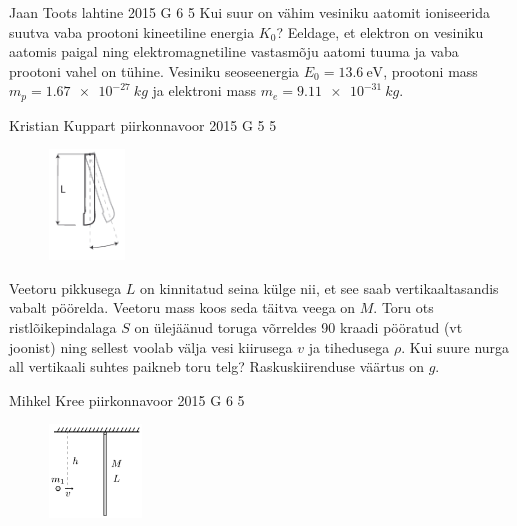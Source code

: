 \documentclass[11pt]{article}
\begin{document}
{%
{Jaan Toots} %
{lahtine} %
{2015} %
{G 6} %
{5} %
{
\ifStatement
Kui suur on vähim vesiniku aatomit ioniseerida suutva vaba prootoni kineetiline energia $K_0$? Eeldage, et elektron on vesiniku aatomis paigal ning elektromagnetiline vastasmõju aatomi tuuma ja vaba prootoni vahel on tühine. Vesiniku seoseenergia $E_0 = \SI{13.6}{\electronvolt}$, prootoni mass $m_p=\SI{1.67e-27}{kg}$ ja elektroni mass $m_e=\SI{9.11e-31}{kg}$.
\fi
}

{Kristian Kuppart} %
{piirkonnavoor} %
{2015} %
{G 5} %
{5} %
{
\ifStatement
\begin{figure}
 \vspace{-30pt}
 \begin{center}
 \includegraphics[width=0.18\textwidth]{2015-v2g-05-toru}
 \end{center}
\end{figure}
Veetoru pikkusega $L$ on kinnitatud seina külge nii, et see saab vertikaaltasandis vabalt pöörelda. Veetoru mass koos seda täitva veega on $M$. Toru ots ristlõikepindalaga $S$ on ülejäänud toruga võrreldes \num{90} kraadi pööratud (vt joonist) ning sellest voolab välja vesi kiirusega $v$ ja tihedusega $\rho$. Kui suure nurga all vertikaali suhtes paikneb toru telg? Raskuskiirenduse väärtus on $g$.
\fi
}

{Mihkel Kree} %
{piirkonnavoor} %
{2015} %
{G 6} %
{5} %
{
\ifStatement

\begin{figure}
 \begin{center}
 \includegraphics[width=0.22\textwidth]{2015-v2g-06-porgejoonis}
 \end{center}
\end{figure}

}}
\end{document}
